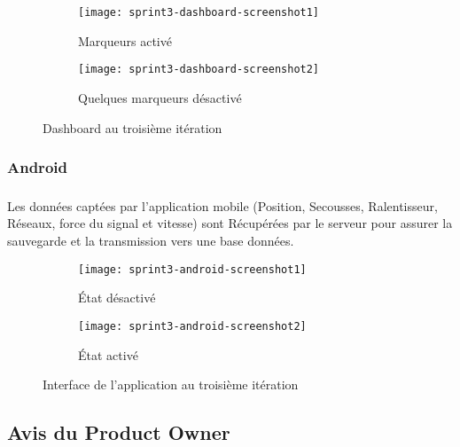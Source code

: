 \begin{figure}[htbp]
\centering
    \begin{subfigure}{.8\textwidth}
    \centering
  \centering
  \texttt{[image: sprint3-dashboard-screenshot1]}
  \caption{Marqueurs activé}
\label{fig:sprint3-dashboard-screenshot1}
\end{subfigure}
\begin{subfigure}{.8\textwidth}
    \centering
  \centering
  \texttt{[image: sprint3-dashboard-screenshot2]}
  \caption{Quelques marqueurs désactivé}
\label{sprint3-dashboard-screenshot2}
\end{subfigure}
\caption{Dashboard  au troisième itération}
\end{figure}
\clearpage

\subsubsection{Android}

\subsubsection*{}

Les données captées par l'application mobile (Position, Secousses,
Ralentisseur, Réseaux, force du signal et vitesse) sont Récupérées par le
serveur pour assurer la sauvegarde et la transmission vers une base données.

\begin{figure}[htbp]
\centering
    \begin{subfigure}{.45\textwidth}
    \centering
  \centering
  \texttt{[image: sprint3-android-screenshot1]}
  \caption{État désactivé}
\label{fig:sprint3-android-screenshot1}
\end{subfigure}
\begin{subfigure}{.45\textwidth}
    \centering
  \centering
  \texttt{[image: sprint3-android-screenshot2]}
  \caption{État activé}
\label{fig:sprint3-android-screenshot2}
\end{subfigure}
\caption{Interface de l'application au troisième itération}
\end{figure}
\clearpage

\subsection{Avis du Product Owner}

